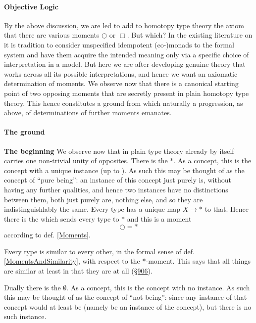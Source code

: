 \hypertarget{ObjectiveLogic}{}\paragraph*{{Objective Logic}}\label{ObjectiveLogic}
By the above discussion, we are led to add to homotopy type theory the axiom that there are various moments $\bigcirc$ or $\Box$. But which?
In the existing literature on  it is tradition to consider unspecified idempotent (co-)monads to the formal system and have them acquire the intended meaning only via a specific choice of interpretation in a model. But here we are after developing genuine theory that works across all its possible interpretations, and hence we want an axiomatic determination of moments.
We observe now that there is a canonical starting point of two opposing moments that are secretly present in plain homotopy type theory. This hence constitutes a ground from which naturally a progression, as \hyperlink{Progression}{above}, of determinations of further moments emanates.
\hypertarget{TheGround}{}\paragraph*{{The ground}}\label{TheGround}
\textbf{The beginning}
We observe now that in plain type theory already by itself carries one non-trivial unity of opposites.
There is the  $\ast$. As a concept, this is the concept with a unique instance (up to ). As such this may be thought of as the concept of ``pure being'': an instance of this concept just purely is, without having any further qualities, and hence two instances have no distinctions between them, both just purely are, nothing else, and so they are indistinguishlably the same.
Every type has a unique map $X\to \ast$ to that. Hence there is the  which sends every type to $\ast$ and this is a moment
\begin{displaymath}
\bigcirc = \ast
\end{displaymath}
according to def. \ref{Moments}.
\begin{example}
\label{SimilarityWithRespectToPureBeing}\hypertarget{SimilarityWithRespectToPureBeing}{}
Every type is similar to every other, in the formal sense of def. \ref{MomentsAndSimilarity}, with respect to the $\ast$-moment. This says that all things are similar at least in that they are at all (\hyperlink{906}{§906}).
\end{example}
Dually there is the  $\emptyset$. As a concept, this is the concept with no instance. As such this may be thought of as the concept of ``not being'': since any instance of that concept would at least be (namely be an instance of the concept), but there is no such instance.
